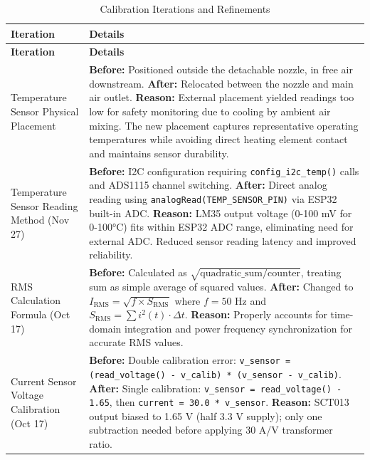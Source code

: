 \documentclass[11pt,a4paper]{article}
\begin{document}
\begin{longtable}{|L{0.2\textwidth}|p{0.75\textwidth}|}
\caption{Calibration Iterations and Refinements}
\label{tab:calibration_iterations} \\
\hline
\textbf{Iteration} & \textbf{Details} \\
\hline
\endfirsthead
\hline
\textbf{Iteration} & \textbf{Details} \\
\hline
\endhead
\hline
\endfoot
\hline
\endlastfoot
Temperature Sensor Physical Placement & \textbf{Before:} Positioned outside the detachable nozzle, in free air downstream. \newline \textbf{After:} Relocated between the nozzle and main air outlet. \newline \textbf{Reason:} External placement yielded readings too low for safety monitoring due to cooling by ambient air mixing. The new placement captures representative operating temperatures while avoiding direct heating element contact and maintains sensor durability. \\
\hline
Temperature Sensor Reading Method (Nov 27) & \textbf{Before:} I2C configuration requiring \texttt{config\_i2c\_temp()} calls and ADS1115 channel switching. \newline \textbf{After:} Direct analog reading using \texttt{analogRead(TEMP\_SENSOR\_PIN)} via ESP32 built-in ADC. \newline \textbf{Reason:} LM35 output voltage (0-100 mV for 0-100°C) fits within ESP32 ADC range, eliminating need for external ADC. Reduced sensor reading latency and improved reliability. \\
\hline
RMS Calculation Formula (Oct 17) & \textbf{Before:} Calculated as $\sqrt{\text{quadratic\_sum} / \text{counter}}$, treating sum as simple average of squared values. \newline \textbf{After:} Changed to $I_{\text{RMS}} = \sqrt{f \times S_{\text{RMS}}}$ where $f = 50$ Hz and $S_{\text{RMS}} = \sum i^2(t) \cdot \Delta t$. \newline \textbf{Reason:} Properly accounts for time-domain integration and power frequency synchronization for accurate RMS values. \\
\hline
Current Sensor Voltage Calibration (Oct 17) & \textbf{Before:} Double calibration error: \texttt{v\_sensor = (read\_voltage() - v\_calib) * (v\_sensor - v\_calib)}. \newline \textbf{After:} Single calibration: \texttt{v\_sensor = read\_voltage() - 1.65}, then \texttt{current = 30.0 * v\_sensor}. \newline \textbf{Reason:} SCT013 output biased to 1.65 V (half 3.3 V supply); only one subtraction needed before applying 30 A/V transformer ratio. \\

\end{longtable}
\end{document}
